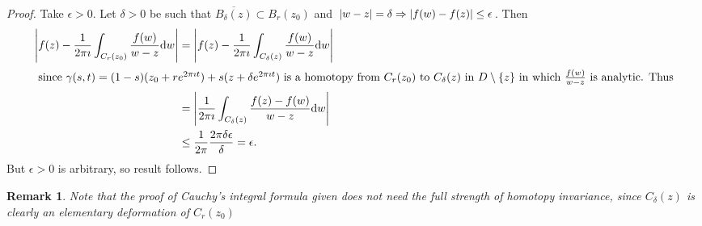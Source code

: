\documentclass{notes}
\theoremstyle{plain}
\newtheorem*{remark}{Remark}
\begin{document}
\begin{figure}[h]
\begin{center}
\end{center}
\end{figure}

\begin{proof}
Take $\epsilon > 0$.  Let $\delta > 0$ be such that $\overline{B_\delta(z)}
\subset B_r(z_0)$ and $\left|w-z\right| = \delta \Rightarrow \left|f(w) - f(z)\right| \le
\epsilon$.  Then
\begin{align*}
\left|f(z) - \frac{1}{2 \pi \imath} \int_{C_r(z_0)} \frac{f(w)}{w-z} \mathrm{d} w\right|
&=
\left|f(z) - \frac{1}{2 \pi \imath} \int_{C_\delta(z)} \frac{f(w)}{w-z} \mathrm{d} w\right| \\
\intertext{ since $\gamma(s,t) = (1-s) (z_0 + r e^{2 \pi \imath t}) +
 s (z +  \delta e^{2 \pi \imath t})$ is a homotopy from $C_r (z_0)$ to
$C_\delta(z)$ in $D \setminus \{ z \}$ in which $\frac{f(w)}{w-z}$ is
analytic.  Thus}
&= \left|\frac{1}{2 \pi \imath}
\int_{C_\delta(z)} \frac{f(z) - f(w)}{w-z} \mathrm{d} w\right| \\
& \le \frac{1}{2 \pi} \frac{ 2 \pi \delta \epsilon}{\delta} = \epsilon.
\end{align*}
But $\epsilon > 0$ is arbitrary, so result follows.
\end{proof}

\begin{remark}
Note that the proof of Cauchy's integral formula given does not need the
full strength of homotopy invariance, since $C_\delta(z)$ is clearly an
elementary deformation of $C_r(z_0)$
\end{remark}
\end{document}
